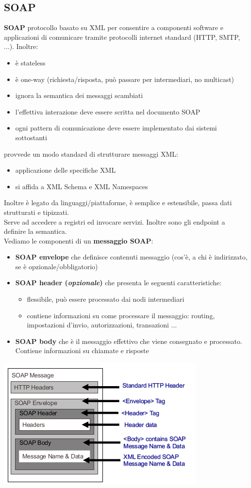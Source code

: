 \documentclass[a4paper,12pt, oneside]{book}
\begin{document}
\subsection{SOAP}
\textbf{SOAP} protocollo basato su XML per consentire a componenti software e applicazioni di comunicare tramite protocolli internet
standard (HTTP, SMTP, ...). Inoltre:
\begin{itemize}
\item è stateless
\item è one-way (richiesta/risposta, può passare per intermediari, no multicast)
\item ignora la semantica dei messaggi scambiati
\item l'effettiva interazione deve essere scritta nel documento SOAP
\item ogni pattern di comunicazione deve essere implementato dai sistemi sottostanti
\end{itemize}
provvede un modo standard di strutturare messaggi XML:
\begin{itemize}
\item applicazione delle specifiche XML
\item si affida a XML Schema e XML Namespaces
\end{itemize}
Inoltre è legato da linguaggi/piattaforme, è semplice e estensibile, passa dati strutturati e tipizzati.\\
Serve ad accedere a registri ed invocare servizi. Inoltre sono gli endpoint a definire la semantica.\\
Vediamo le componenti di un \textbf{messaggio SOAP}:
\begin{itemize}
\item \textbf{SOAP envelope} che definisce contenuti messaggio (cos'è, a chi è indirizzato, se è opzionale/obbligatorio)
\item \textbf{SOAP header (\textit{opzionale})} che presenta le seguenti caratteristiche:
  \begin{itemize}
    \item flessibile, può essere processato dai nodi intermediari
    \item contiene informazioni su come processare il messaggio: routing, impostazioni d'invio, autorizzazioni, transazioni ...
    \end{itemize}
\item \textbf{SOAP body} che è il messaggio effettivo che viene consegnato e processato. Contiene informazioni su chiamate e risposte
\end{itemize}
\begin{center}
\includegraphics[scale=0.6]{img/soap.png}
\end{center}
\end{document}
